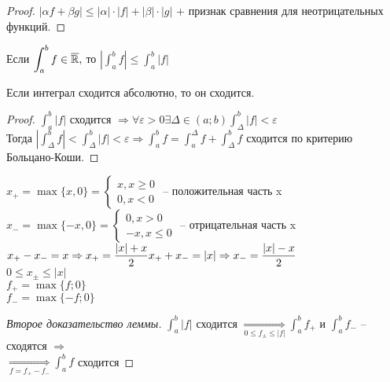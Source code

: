 \begin{proof}
	$|\alpha f + \beta g| \leqslant |\alpha| \cdot |f| + |\beta| \cdot |g|$ + признак сравнения для неотрицательных функций.
\end{proof}

\begin{Rem}
	Если $\displaystyle \int_{a}^{b} f \in \overline{\mathbb{R}},$ то $\displaystyle \left| \int_{a}^{b} f \right| \leqslant \int_{a}^{b}|f|$
\end{Rem}

\begin{Lm}
	Если интеграл сходится абсолютно, то он сходится.
\end{Lm}

\begin{proof}
	$\displaystyle \int_{a}^{b} |f|$ сходится $\displaystyle \Rightarrow \forall \varepsilon > 0 \exists \Delta \in (a;b) \int_{\Delta}^{b} |f| < \varepsilon$\\
	Тогда $\displaystyle \left| \int_{\Delta}^{b} f \right| < \int_{\Delta}^{b} |f| < \varepsilon \Rightarrow 
	\int_{a}^{b} f = \int_{a}^{\Delta} f + \int_{\Delta}^{b} f$ сходится по критерию Больцано-Коши.
\end{proof}

\begin{Def} 
	$x_+= \max\{x,0\} = \begin{cases} x, x \geqslant 0\\ 0, x<0 \end{cases}$ -- положительная часть x\\
	$x_-= \max\{-x,0\} = \begin{cases} 0, x > 0\\ -x, x \leqslant 0 \end{cases}$ -- отрицательная часть x\\
	$x_+ - x_- = x \displaystyle \Rightarrow x_+ = \frac{|x|+x}{2}\\
	x_+ + x_- = |x| \Rightarrow x_- = \frac{|x|-x}{2}$\\
	$0 \leqslant x_{\pm} \leqslant |x|$\\
	$f_+ = \max \{f;0\}$\\
	$f_- = \max \{-f;0\}$
\end{Def} 

\begin{proof}[Второе доказательство леммы]
	$\displaystyle \int_{a}^{b} |f|$ сходится $\displaystyle \underset{0 \leqslant f_{\pm} \leqslant|f|}{\Rightarrow} \int_{a}^{b} f_+$ и $\displaystyle \int_{a}^{b} f_-$ -- сходятся $\Rightarrow$ \\ 
	$\displaystyle \underset{f = f_+ - f_-}{\Rightarrow} \int_{a}^{b} f$ сходится 
\end{proof}

